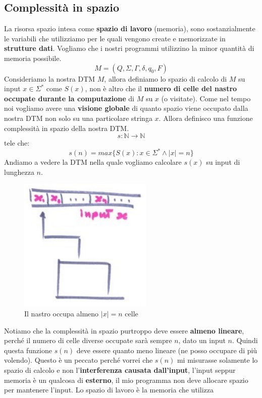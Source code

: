 \documentclass{article}
\begin{document}
\subsection{Complessità in spazio}
La risorsa spazio intesa come \textbf{spazio di lavoro} (memoria), sono sostanzialmente le
variabili che utilizziamo per le quali vengono
create e memorizzate in \textbf{strutture dati}. Vogliamo che i nostri programmi utilizzino
la minor quantità di memoria possibile.
$$M=(Q,\Sigma,\Gamma,\delta,q_0,F)$$
Consideriamo la nostra DTM $M$, allora definiamo lo spazio di calcolo di $M$ su input $x\in\Sigma^*$
come $S(x)$, non è altro che il \textbf{numero di celle del nastro occupate durante la computazione}
di $M$ su $x$ (o visitate). Come nel tempo noi vogliamo avere una \textbf{visione globale} di quanto spazio viene
occupato dalla nostra DTM non solo su una particolare stringa $x$. Allora definisco una funzione
complessità in spazio della nostra DTM.
$$s:\mathbb{N}\rightarrow\mathbb{N}$$
tele che:
$$s(n)=max\{S(x):x\in\Sigma^*\land|x|=n\}$$
Andiamo a vedere la DTM nella quale vogliamo calcolare $s(x)$ su input di lunghezza $n$.
\begin{figure}[H]
    \centering
    \includegraphics[scale=0.6]{images/computazione_DTM.png}
    \caption{Il nastro occupa almeno $|x|=n$ celle}
\end{figure}
Notiamo che la complessità in spazio purtroppo deve essere \textbf{almeno lineare}, perché il numero
di celle diverse occupate sarà sempre $n$, dato un input $n$. Quindi questa funzione $s(n)$
deve essere quanto meno lineare (ne posso occupare di più volendo). Questo è un peccato
perché vorrei che $s(n)$ mi misurasse solamente lo spazio di calcolo e non l'\textbf{interferenza
causata dall'input}, l'input seppur memoria è un qualcosa di \textbf{esterno}, il mio programma
non deve allocare spazio per mantenere l'input.
\newline\newline Lo spazio di lavoro è la memoria che utilizza
\end{document}
